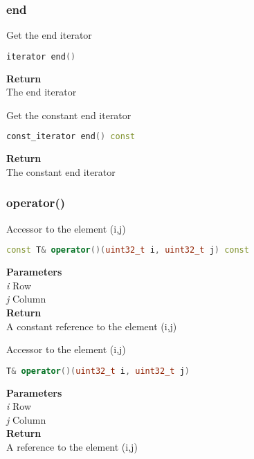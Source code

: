 \subsubsection{end}
\begin{mdframed}
Get the end iterator
\begin{lstlisting}[language=C++]
iterator end() 
\end{lstlisting}
\textbf{Return} \\ 
The end iterator\\ 
\end{mdframed}

\begin{mdframed}
Get the constant end iterator
\begin{lstlisting}[language=C++]
const_iterator end() const 
\end{lstlisting}
\textbf{Return} \\ 
The constant end iterator\\ 
\end{mdframed}

\subsubsection{operator()}
\begin{mdframed}
Accessor to the element (i,j)
\begin{lstlisting}[language=C++]
const T& operator()(uint32_t i, uint32_t j) const 
\end{lstlisting}
\textbf{Parameters} \\ 
\textit{i} Row \\ 
\textit{j} Column \\ 
\textbf{Return} \\ 
A constant reference to the element (i,j) \\ 
\end{mdframed}

\begin{mdframed}
Accessor to the element (i,j)
\begin{lstlisting}[language=C++]
T& operator()(uint32_t i, uint32_t j) 
\end{lstlisting}
\textbf{Parameters} \\ 
\textit{i} Row \\ 
\textit{j} Column \\ 
\textbf{Return} \\ 
A reference to the element (i,j) \\ 
\end{mdframed}

